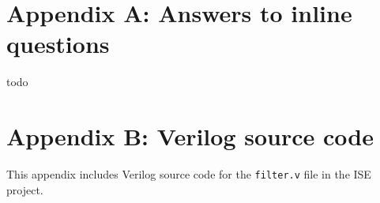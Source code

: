\section{Appendix A: Answers to inline questions}
todo
\section{Appendix B: Verilog source code}
This appendix includes Verilog source code for the \texttt{filter.v} file in the ISE project.

\begin{verbatim}
\end{verbatim}
